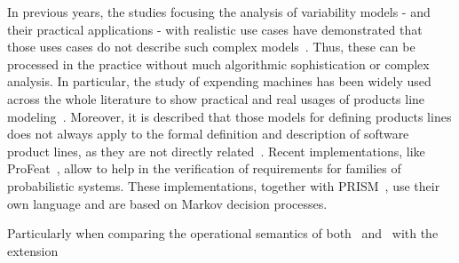 In previous years, the studies focusing the analysis of variability models  - and
their practical applications - with realistic use cases 
have demonstrated that those uses cases do not describe such complex models~\cite{jhf11, jhfes12}. Thus, these
can be processed in the practice without much algorithmic sophistication or
complex analysis.
In particular, the study of expending machines
has been widely used across the whole
literature to show practical and real usages of products
line modeling~\cite{jhfes12}. Moreover, it is described that those models for defining products
lines does not always apply to the
formal definition and description of software
product lines, as they are not directly related~\cite{cds06, fub06, nnz14}.
Recent implementations, like ProFeat~\cite{Chrszon2018}, allow to 
help in the verification of requirements for families of probabilistic systems. These implementations,  
together with PRISM~\cite{mgd12}, use their own language and are based on Markov decision processes.












Particularly when comparing the operational semantics of both~\cite{Dubslaff2015} and~\cite{vk13}    
with the extension 

